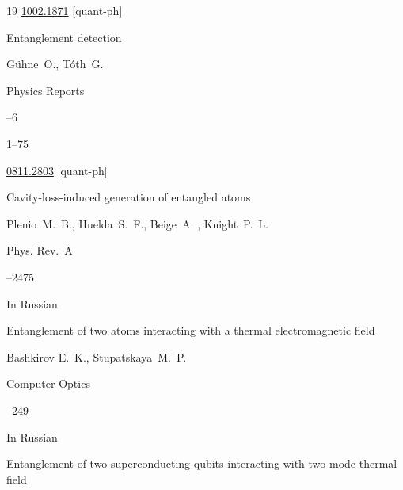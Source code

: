 \begin{thebibliography}{19}
\arxiv \href{http://arxiv.org/abs/1002.1871}{1002.1871} [quant-ph]






\paper  Entanglement detection

\by G\"uhne~O., T\'oth~G.

\jour Physics Reports



--6

\pages \mbox{1--75}


\arxiv \href{http://arxiv.org/abs/0811.2803}{0811.2803} [quant-ph]












\paper Cavity-loss-induced generation of entangled atoms

\by   Plenio~M.~B.,  Huelda~S.~F.,  Beige~A. ,  Knight~P.~L.

\jour Phys. Rev.~A




--2475







\lang In Russian

\paper Entanglement of two atoms interacting with a thermal electromagnetic field

\by Bashkirov E.~K., Stupatskaya~M.~P.

\jour Computer Optics




--249






\lang In Russian

\paper  Entanglement of two superconducting qubits interacting with two-mode thermal field


\end{thebibliography}
